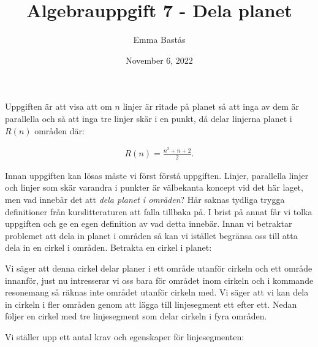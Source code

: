 \documentclass{article}
\title{Algebrauppgift 7 - Dela planet}
\author{Emma Bastås}
\date{November 6, 2022}
\begin{document}
\maketitle

Uppgiften är att visa att om $n$ linjer är ritade på planet så att inga av dem är parallella och så att inga tre linjer skär i en punkt, då delar linjerna planet i $R(n)$ områden där:

\begin{gather*}
  R(n) = \frac{n^{2} + n + 2}{2}\text{.}
\end{gather*}

Innan uppgiften kan lösas måste vi först förstå uppgiften. Linjer, parallella linjer och linjer som skär varandra i punkter är välbekanta koncept vid det här laget, men vad innebär det att \emph{dela planet i områden}? Här saknas tydliga trygga definitioner från kurslitteraturen att falla tillbaka på. I brist på annat får vi tolka uppgiften och ge en egen definition av vad detta innebär. Innan vi betraktar problemet att dela in planet i områden så kan vi istället begränsa oss till atta dela in en cirkel i områden. Betrakta en cirkel i planet:

\begin{center}
\end{center}

Vi säger att denna cirkel delar planer i ett område utanför cirkeln och ett område innanför, just nu intresserar vi oss bara för området inom cirkeln och i kommande resonemang så räknas inte området utanför cirkeln med. Vi säger att vi kan dela in cirkeln i fler områden genom att lägga till linjesegment ett efter ett. Nedan följer en cirkel med tre linjesegment som delar cirkeln i fyra områden.

\begin{center}
\end{center}

Vi ställer upp ett antal krav och egenskaper för linjesegmenten:
\end{document}
